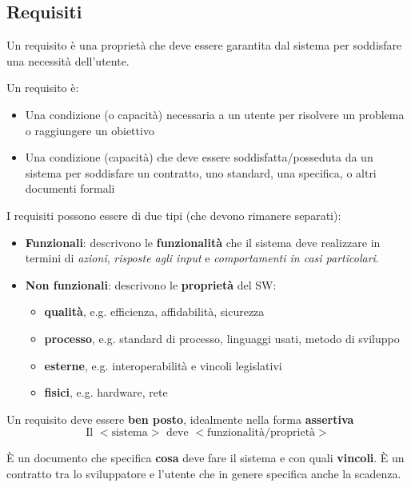 \subsection{Requisiti}
Un requisito è una proprietà che deve essere garantita dal sistema per soddisfare una necessità dell'utente.
\begin{definition}
	Un requisito è:
	\begin{itemize}
		\item Una condizione (o capacità) necessaria a un utente per risolvere un problema o raggiungere un obiettivo
		\item Una condizione (capacità) che deve essere soddisfatta/posseduta da un sistema per soddisfare un contratto, uno standard, una specifica, o altri documenti formali
	\end{itemize}
\end{definition}
\noindent I requisiti possono essere di due tipi (che devono rimanere separati):
\begin{itemize}
	\item \textbf{Funzionali}: descrivono le \textbf{funzionalità} che il sistema deve realizzare in termini di \textit{azioni}, \textit{risposte agli input} e \textit{comportamenti in casi particolari}.
	\item \textbf{Non funzionali}: descrivono le \textbf{proprietà} del SW:
	\begin{itemize}
		\item \textbf{qualità}, e.g. efficienza, affidabilità, sicurezza
		\item \textbf{processo}, e.g. standard di processo, linguaggi usati, metodo di sviluppo
		\item \textbf{esterne}, e.g. interoperabilità e vincoli legislativi
		\item \textbf{fisici}, e.g. hardware, rete
	\end{itemize}
\end{itemize}
\begin{observation}
	Un requisito deve essere \textbf{ben posto}, idealmente nella forma \textbf{assertiva}
	\begin{equation*}
		\text{Il } <\text{sistema}>\text{ deve }<\text{funzionalità/proprietà}>
	\end{equation*}
\end{observation}

\begin{definition}
	È un documento che specifica \textbf{cosa} deve fare il sistema e con quali \textbf{vincoli}. È un contratto tra lo sviluppatore e l'utente che in genere specifica anche la scadenza.
\end{definition}

